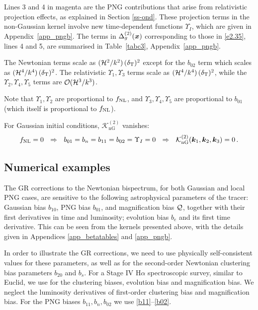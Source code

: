 {{{\begin{itemize}
Lines 3 and 4 in {magenta} are the PNG contributions that arise from relativistic projection effects, as explained in Section \ref{ss-ond}. 
These projection terms in the non-Gaussian kernel involve new time-dependent functions $\Upsilon_I$, which are given in Appendix~\ref{app_pngb}.
{The terms in $\Delta_g^{(2)}(\bm {x})$ corresponding to those in \eqref{e2.35}, lines 4 and 5, are summarised in Table~\ref{tabc3}, Appendix~\ref{app_pngb}.}

{The Newtonian terms scale as $(\mathcal{H}^2/k^2)\,(\delta_{\mathrm{T}})^2$ except for the $b_{02}$ term which scales as $(\mathcal{H}^4/k^4)\,(\delta_{\mathrm{T}})^2$. The relativistic $\Upsilon_1, \Upsilon_3$ terms scale as $(\mathcal{H}^4/k^4)\,(\delta_{\mathrm{T}})^2$, while the $\Upsilon_2, \Upsilon_4, \Upsilon_5$ terms are  ${\cal O}(\mathcal{H}^3/k^3)$.}

Note that $\Upsilon_1,\Upsilon_2$ are proportional to $f_\text{NL}$, and $\Upsilon_3,\Upsilon_4,\Upsilon_5$ are  proportional to $b_{01}$ (which itself is proportional to $f_\text{NL}$).

For Gaussian initial conditions, $\mathcal{K}^{(2)}_{\mathrm{nG}}$ vanishes: 
\begin{equation}
f_\text{NL}=0~~\Rightarrow~~b_{01}=b_n=b_{11}=b_{02}=\Upsilon_I=0 ~~\Rightarrow~~ \mathcal{K}^{(2)}_{\mathrm{nG}}(\bm{k}_{1}, \bm{k}_{2}, \bm{k}_{3})=0\,.
\end{equation}

\end{itemize}
%
\subsection{Numerical examples}
{The GR corrections to the Newtonian bispectrum, for both Gaussian and local PNG cases, are sensitive to the following astrophysical parameters of the tracer: Gaussian bias $b_{10}$, PNG bias $b_{01}$,  and magnification bias ${\cal Q}$, together with  their first derivatives in time and luminosity; evolution bias $b_e$ and its first  time derivative. This can be seen from the kernels presented above,  with the details given in Appendices \ref{app_betatables} and \ref{app_pngb}.} 

In order to illustrate the GR corrections, we need to use physically self-consistent values for these parameters, as well as for the second-order Newtonian clustering bias parameters $b_{20}$ and $b_s$.  
For a Stage IV H$\alpha$ spectroscopic survey, similar to Euclid,  we use \cite{Maartens:2019yhx} for the  clustering biases, evolution bias and magnification bias. {We neglect the luminosity derivatives of first-order clustering bias and magnification bias. For the PNG biases $b_{11}, b_n, b_{02}$ we use \eqref{b11}--\eqref{b02}.}

}}}
